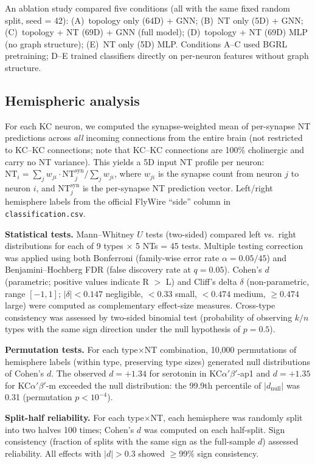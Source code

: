 \documentclass[10pt]{article}
\begin{document}
An ablation study compared five conditions (all with the same fixed random split, seed = 42): (A)~topology only (64D) + GNN; (B)~NT only (5D) + GNN; (C)~topology + NT (69D) + GNN (full model); (D)~topology + NT (69D) MLP (no graph structure); (E)~NT only (5D) MLP. Conditions A--C used BGRL pretraining; D--E trained classifiers directly on per-neuron features without graph structure.

\subsection*{Hemispheric analysis}
For each KC neuron, we computed the synapse-weighted mean of per-synapse NT predictions across \textit{all} incoming connections from the entire brain (not restricted to KC--KC connections; note that KC--KC connections are 100\% cholinergic and carry no NT variance). This yields a 5D input NT profile per neuron: $\mathrm{NT}_i = \sum_j w_{ji} \cdot \mathrm{NT}_j^{\mathrm{syn}} / \sum_j w_{ji}$, where $w_{ji}$ is the synapse count from neuron $j$ to neuron $i$, and $\mathrm{NT}_j^{\mathrm{syn}}$ is the per-synapse NT prediction vector. Left/right hemisphere labels from the official FlyWire ``side'' column in \texttt{classification.csv}.

\textbf{Statistical tests.} Mann--Whitney $U$ tests (two-sided) compared left vs.\ right distributions for each of 9 types $\times$ 5 NTs = 45 tests. Multiple testing correction was applied using both Bonferroni (family-wise error rate $\alpha = 0.05/45$) and Benjamini--Hochberg FDR (false discovery rate at $q = 0.05$). Cohen's $d$ (parametric; positive values indicate R $>$ L) and Cliff's delta $\delta$ (non-parametric, range $[-1, 1]$; $|\delta| < 0.147$ negligible, $< 0.33$ small, $< 0.474$ medium, $\geq 0.474$ large) were computed as complementary effect-size measures. Cross-type consistency was assessed by two-sided binomial test (probability of observing $k/n$ types with the same sign direction under the null hypothesis of $p = 0.5$).

\textbf{Permutation tests.} For each type$\times$NT combination, 10,000 permutations of hemisphere labels (within type, preserving type sizes) generated null distributions of Cohen's $d$. The observed $d = +1.34$ for serotonin in KC$\alpha'\beta'$-ap1 and $d = +1.35$ for KC$\alpha'\beta'$-m exceeded the null distribution: the 99.9th percentile of $|d_\mathrm{null}|$ was 0.31 (permutation $p < 10^{-4}$).

\textbf{Split-half reliability.} For each type$\times$NT, each hemisphere was randomly split into two halves 100 times; Cohen's $d$ was computed on each half-split. Sign consistency (fraction of splits with the same sign as the full-sample $d$) assessed reliability. All effects with $|d| > 0.3$ showed $\geq$99\% sign consistency.
\end{document}
